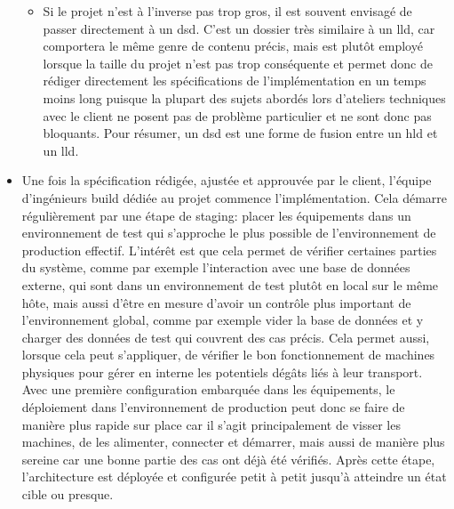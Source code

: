 \documentclass[12pt, oneside, a4paper, titlepage]{report}
\begin{document}
\begin{itemize}
\begin{itemize}
        \item Si le projet n'est à l'inverse pas trop gros, il est souvent
            envisagé de passer directement à un \gls{dsd}. C'est un dossier très
            similaire à un \gls{lld}, car comportera le même genre de contenu
            précis, mais est plutôt employé lorsque la taille du projet n'est
            pas trop conséquente et permet donc de rédiger directement les
            spécifications de l'implémentation en un temps moins long puisque la
            plupart des sujets abordés lors d'ateliers techniques avec le client
            ne posent pas de problème particulier et ne sont donc pas bloquants.
            Pour résumer, un \gls{dsd} est une forme de fusion entre un
            \gls{hld} et un \gls{lld}.

    \end{itemize}

    \item Une fois la spécification rédigée, ajustée et approuvée par le client,
        l'équipe d'ingénieurs \gls{build} dédiée au projet commence
        l'implémentation. Cela démarre régulièrement par une étape de
        \gls{staging}: placer les équipements dans un environnement de test qui
        s'approche le plus possible de l'environnement de production effectif.
        L'intérêt est que cela permet de vérifier certaines parties du système,
        comme par exemple l'interaction avec une base de données externe, qui
        sont dans un environnement de test plutôt en local sur le même hôte,
        mais aussi d'être en mesure d'avoir un contrôle plus important de
        l'environnement global, comme par exemple vider la base de données et y
        charger des données de test qui couvrent des cas précis. Cela permet
        aussi, lorsque cela peut s'appliquer, de vérifier le bon fonctionnement
        de machines physiques pour gérer en interne les potentiels dégâts liés à
        leur transport. Avec une première configuration embarquée dans les
        équipements, le déploiement dans l'environnement de production peut donc
        se faire de manière plus rapide sur place car il s'agit principalement
        de visser les machines, de les alimenter, connecter et démarrer, mais
        aussi de manière plus sereine car une bonne partie des cas ont déjà été
        vérifiés. Après cette étape, l'architecture est déployée et configurée
        petit à petit jusqu'à atteindre un état cible ou presque.


\end{itemize}
\end{document}
